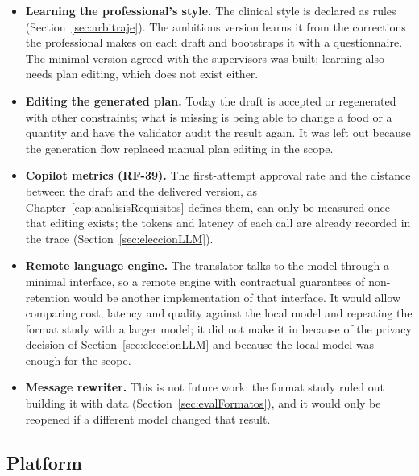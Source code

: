 \begin{itemize}
    \item \textbf{Learning the professional's style.} The clinical style is declared as rules (Section~\ref{sec:arbitraje}). The ambitious version learns it from the corrections the professional makes on each draft and bootstraps it with a questionnaire. The minimal version agreed with the supervisors was built; learning also needs plan editing, which does not exist either.
    \item \textbf{Editing the generated plan.} Today the draft is accepted or regenerated with other constraints; what is missing is being able to change a food or a quantity and have the validator audit the result again. It was left out because the generation flow replaced manual plan editing in the scope.
    \item \textbf{Copilot metrics (RF-39).} The first-attempt approval rate and the distance between the draft and the delivered version, as Chapter~\ref{cap:analisisRequisitos} defines them, can only be measured once that editing exists; the tokens and latency of each call are already recorded in the trace (Section~\ref{sec:eleccionLLM}).
    \item \textbf{Remote language engine.} The translator talks to the model through a minimal interface, so a remote engine with contractual guarantees of non-retention would be another implementation of that interface. It would allow comparing cost, latency and quality against the local model and repeating the format study with a larger model; it did not make it in because of the privacy decision of Section~\ref{sec:eleccionLLM} and because the local model was enough for the scope.
    \item \textbf{Message rewriter.} This is not future work: the format study ruled out building it with data (Section~\ref{sec:evalFormatos}), and it would only be reopened if a different model changed that result.
\end{itemize}

\subsection*{Platform}
\label{sec:futurePlatform}

